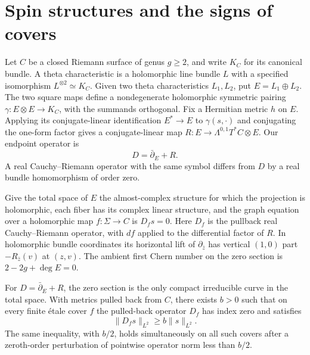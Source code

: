\section{Spin structures and the signs of covers}\label{sec:spin}

Let $C$ be a closed Riemann surface of genus $g\ge2$, and write $K_C$
for its canonical bundle. A theta characteristic is a holomorphic line
bundle $L$ with a specified isomorphism $L^{\otimes2}\simeq K_C$.
Given two theta characteristics $L_1,L_2$, put $E=L_1\oplus L_2$.
The two square maps define a nondegenerate holomorphic symmetric
pairing $\gamma:E\otimes E\to K_C$, with the summands orthogonal.
Fix a Hermitian metric $h$ on $E$. Applying its conjugate-linear
identification $E^*\to E$ to $\gamma(s,\cdot)$ and conjugating the
one-form factor gives a conjugate-linear map
$R:E\to\Lambda^{0,1}T^*C\otimes E$. Our endpoint operator is
\[
                 D=\bar\partial_E+R .
\]
A real Cauchy--Riemann operator with the same symbol differs from $D$
by a real bundle homomorphism of order zero.

Give the total space of $E$ the almost-complex structure for which
the projection is holomorphic, each fiber has its complex linear
structure, and the graph equation over a holomorphic map
$f:\Sigma\to C$ is $D_f s=0$. Here $D_f$ is the pullback real
Cauchy--Riemann operator, with $df$ applied to the differential
factor of $R$. In holomorphic bundle coordinates its horizontal lift
of $\partial_{\bar z}$ has vertical $(1,0)$ part $-R_{\bar z}(v)$
at $(z,v)$. The ambient first Chern number on the zero section is
$2-2g+\deg E=0$.

\begin{lemma}\label{lem:spin-gap}
For $D=\bar\partial_E+R$, the zero section is the only compact
irreducible curve in the total space. With metrics pulled back from
$C$, there exists $b>0$ such that on every finite \'etale cover $f$
the pulled-back operator $D_f$ has index zero and satisfies
\[
                       \|D_f s\|_{L^2}\ge b\|s\|_{L^2}.
\]
The same inequality, with $b/2$, holds simultaneously on all such
covers after a zeroth-order perturbation of pointwise operator norm
less than $b/2$.
\end{lemma}


